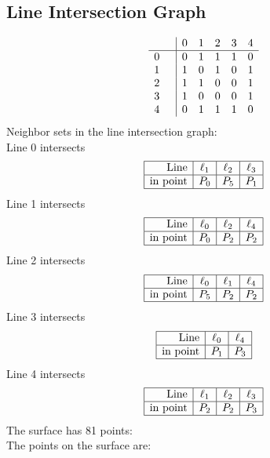 \documentclass{article}
\begin{document}
{\subsection*{Line Intersection Graph}
{\arraycolsep=1pt
$$
\begin{array}{rr|*{5}r}
 &  & 0 & 1 & 2 & 3 & 4\\
\hline
0 &  & 0 & 1 & 1 & 1 & 0\\
1 &  & 1 & 0 & 1 & 0 & 1\\
2 &  & 1 & 1 & 0 & 0 & 1\\
3 &  & 1 & 0 & 0 & 0 & 1\\
4 &  & 0 & 1 & 1 & 1 & 0\\
\end{array}
$$
}%
Neighbor sets in the line intersection graph:\\
Line 0 intersects 
$$
\begin{array}{|r*{3}{|c}|}
\hline
\mbox{Line}  & \ell_{1} & \ell_{2} & \ell_{3}\\
\hline
\mbox{in point}  & P_{0} & P_{5} & P_{1}\\
\hline
\end{array}
$$
Line 1 intersects 
$$
\begin{array}{|r*{3}{|c}|}
\hline
\mbox{Line}  & \ell_{0} & \ell_{2} & \ell_{4}\\
\hline
\mbox{in point}  & P_{0} & P_{2} & P_{2}\\
\hline
\end{array}
$$
Line 2 intersects 
$$
\begin{array}{|r*{3}{|c}|}
\hline
\mbox{Line}  & \ell_{0} & \ell_{1} & \ell_{4}\\
\hline
\mbox{in point}  & P_{5} & P_{2} & P_{2}\\
\hline
\end{array}
$$
Line 3 intersects 
$$
\begin{array}{|r*{2}{|c}|}
\hline
\mbox{Line}  & \ell_{0} & \ell_{4}\\
\hline
\mbox{in point}  & P_{1} & P_{3}\\
\hline
\end{array}
$$
Line 4 intersects 
$$
\begin{array}{|r*{3}{|c}|}
\hline
\mbox{Line}  & \ell_{1} & \ell_{2} & \ell_{3}\\
\hline
\mbox{in point}  & P_{2} & P_{2} & P_{3}\\
\hline
\end{array}
$$
The surface has 81 points:\\
The points on the surface are:\\
}
\end{document}
